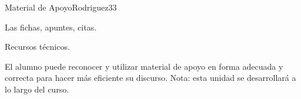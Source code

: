 \begin{syllabus}
\begin{unit}{Material de Apoyo}{Rodriguez}{3}{3}
\begin{topics}
	\item Las fichas, apuntes, citas.
	\item Recursos técnicos.
\end{topics}
\begin{unitgoals}
	\item El alumno puede reconocer y utilizar material de apoyo en forma adecuada y correcta para hacer más eficiente su discurso. Nota: esta unidad se desarrollará a lo largo del curso.
\end{unitgoals}
\end{unit}



\begin{coursebibliography}
\end{coursebibliography}
\end{syllabus}
